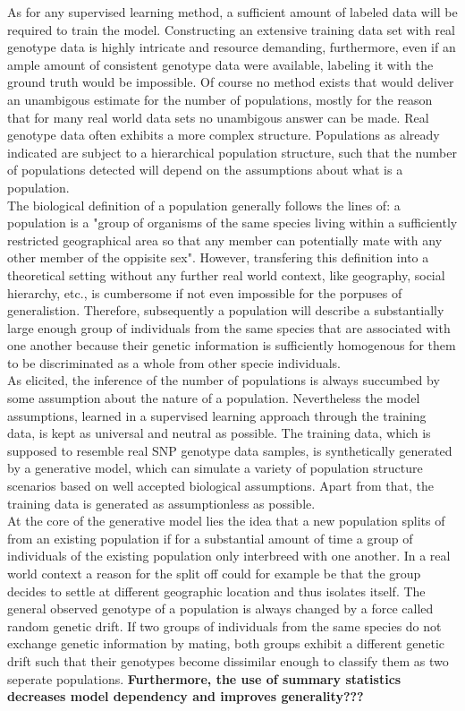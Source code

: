 \documentclass[a4paper, 11pt]{article}
\begin{document}
As for any supervised learning method, a sufficient amount of labeled data will be required to train the model. Constructing an extensive training data set with real genotype data is highly intricate and resource demanding, furthermore, even if an ample amount of consistent genotype data were available, labeling it with the ground truth would be impossible. Of course no method exists that would deliver an unambigous estimate for the number of populations, mostly for the reason that for many real world data sets no unambigous answer can be made. Real genotype data often exhibits a more complex structure. Populations as already indicated are subject to a hierarchical population structure, such that the number of populations detected will depend on the assumptions about what is a population.\\
The biological definition of a population generally follows the lines of: a population is a "group of organisms of the same species living within a sufficiently restricted geographical area so that any member can potentially mate with any other member of the oppisite sex". However, transfering this definition into a theoretical setting without any further real world context, like geography, social hierarchy, etc., is cumbersome if not even impossible for the porpuses of generalistion. Therefore, subsequently a population will describe a substantially large enough group of individuals from the same species that are associated with one another because their genetic information is sufficiently homogenous for them to be discriminated as a whole from other specie individuals. \\
As elicited, the inference of the number of populations is always succumbed by some assumption about the nature of a population. Nevertheless the model assumptions, learned in a supervised learning  approach through the training data, is kept as universal and neutral as possible. The training data, which is supposed to resemble real SNP genotype data samples, is synthetically generated by a generative model, which can simulate a variety of population structure scenarios based on well accepted biological assumptions. Apart from that, the training data is generated as assumptionless as possible.\\
At the core of the generative model lies the idea that a new population splits of from an existing population if for a substantial amount of time a group of individuals of the existing population only interbreed with one another. In a real world context a reason for the split off could for example be that the group decides to settle at different geographic location and thus isolates itself. The general observed genotype of a population is always changed by a force called random genetic drift. If two groups of individuals from the same species do not exchange genetic information by mating, both groups exhibit a different genetic drift such that their genotypes become dissimilar enough to classify them as two seperate populations. \textbf{Furthermore, the use of summary statistics decreases model dependency and improves generality???}
\end{document}
